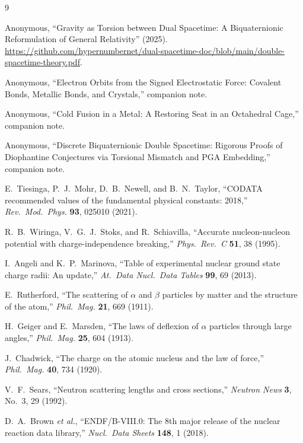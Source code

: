 \documentclass[a4paper]{article}
\begin{document}
\begin{thebibliography}{9}

Anonymous,
``Gravity as Torsion between Dual Spacetime: A Biquaternionic Reformulation of General Relativity'' (2025).
\url{https://github.com/hypernumbernet/dual-spacetime-doc/blob/main/double-spacetime-theory.pdf}.

Anonymous,
``Electron Orbits from the Signed Electrostatic Force: Covalent Bonds, Metallic Bonds, and Crystals,''
companion note.

Anonymous,
``Cold Fusion in a Metal: A Restoring Seat in an Octahedral Cage,''
companion note.

Anonymous,
``Discrete Biquaternionic Double Spacetime: Rigorous Proofs of Diophantine Conjectures via Torsional Mismatch and PGA Embedding,''
companion note.

E.~Tiesinga, P.~J.~Mohr, D.~B.~Newell, and B.~N.~Taylor,
``CODATA recommended values of the fundamental physical constants: 2018,''
\textit{Rev.\ Mod.\ Phys.} \textbf{93}, 025010 (2021).

R.~B.~Wiringa, V.~G.~J.~Stoks, and R.~Schiavilla,
``Accurate nucleon-nucleon potential with charge-independence breaking,''
\textit{Phys.\ Rev.\ C} \textbf{51}, 38 (1995).

I.~Angeli and K.~P.~Marinova,
``Table of experimental nuclear ground state charge radii: An update,''
\textit{At.\ Data Nucl.\ Data Tables} \textbf{99}, 69 (2013).

E.~Rutherford,
``The scattering of \(\alpha\) and \(\beta\) particles by matter and the structure of the atom,''
\textit{Phil.\ Mag.} \textbf{21}, 669 (1911).

H.~Geiger and E.~Marsden,
``The laws of deflexion of \(\alpha\) particles through large angles,''
\textit{Phil.\ Mag.} \textbf{25}, 604 (1913).

J.~Chadwick,
``The charge on the atomic nucleus and the law of force,''
\textit{Phil.\ Mag.} \textbf{40}, 734 (1920).

V.~F.~Sears,
``Neutron scattering lengths and cross sections,''
\textit{Neutron News} \textbf{3}, No.~3, 29 (1992).

D.~A.~Brown \textit{et al.},
``ENDF/B-VIII.0: The 8th major release of the nuclear reaction data library,''
\textit{Nucl.\ Data Sheets} \textbf{148}, 1 (2018).

\end{thebibliography}
\end{document}
